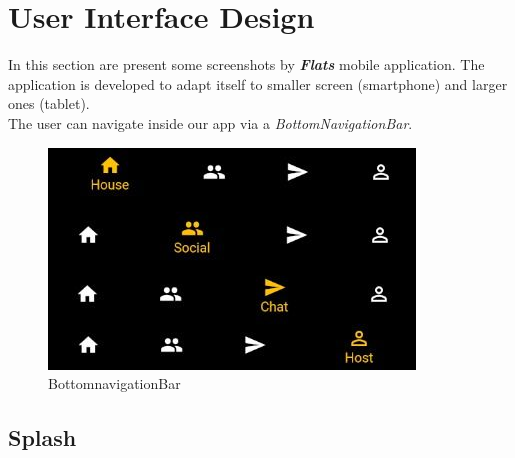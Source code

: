 \chapter{User Interface Design}
In this section are present some screenshots by \textbf{\textit{Flats}} mobile application. The application is developed to adapt itself to smaller screen (smartphone) and larger ones (tablet). \\

The user can navigate inside our app via a \textit{BottomNavigationBar}.
\begin{figure}[H]
    \centering
    \includegraphics[scale = 0.7]{images/bnb.jpeg}
    \caption{BottomnavigationBar}
\end{figure}

\section{Splash}

